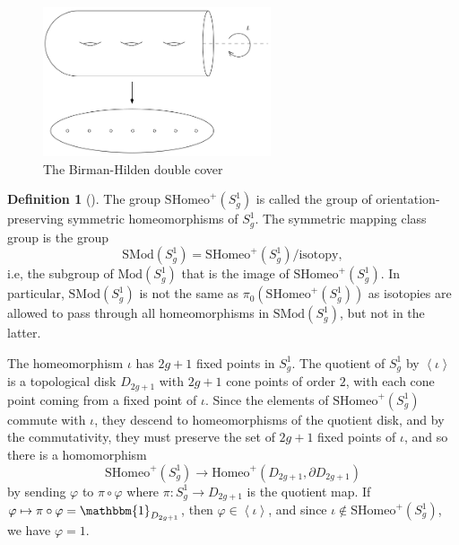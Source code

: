 \documentclass[reqno]{amsart}
\theoremstyle{definition}
\newtheorem{definition}[theorem]{Definition}
\theoremstyle{remark}
\newcommand{\Mod}{{\mathrm{Mod}}}
\newcommand{\SMod}{{\mathrm{SMod}}}
\newcommand{\Homeo}{{\mathrm{Homeo}}}
\newcommand{\SHomeo}{{\mathrm{SHomeo}}}
\begin{document}
 \begin{figure}[H]
     \centering
     \includegraphics[width=0.6\textwidth]{birman-hilden-double-cover.png}
     \caption{The Birman-Hilden double cover}
     \label{fig:birman-hilden-double-cover-png}
 \end{figure}

 \begin{definition}[]
 The group $\SHomeo^{+} \left( S_g^{1} \right) $ is
 called the group of orientation-preserving
 symmetric homeomorphisms of $S_g^{1}$. 
 The symmetric mapping class group is the group
 \[
 \SMod (S_g^{1}) = 
 \SHomeo^{+} \left( S_g^{1} \right) / \text{isotopy},
 \] 
 i.e, the subgroup of $\Mod \left( S_g^{1} \right) $ that
 is the image of $\SHomeo^{+} \left( S_g^{1} \right) $.
 In particular,
 $\SMod \left( S_g^{1} \right) $ is not the same
 as
 $\pi_0 \left( \SHomeo^{+} 
 \left( S_g^{1} \right) \right) $ as isotopies are
 allowed to pass through all homeomorphisms 
 in $\SMod \left( S_g^{1} \right) $, but not
 in the latter.
 \end{definition}

 The homeomorphism $\iota$ has
  $2g+1$ fixed points in
   $S_g^{1}$. The quotient of
   $S_g^{1}$ by $\left<\iota \right>$ is
   a topological disk
   $D_{2g+1}$ with $2g+1$ cone points of order
   $2$, with each cone point coming from a fixed point of $\iota$.
   Since the elements of  $\SHomeo^{+} \left( S_g^{1} \right) $ 
   commute with $\iota$, they descend to homeomorphisms
   of the quotient disk, and by the commutativity, they
   must preserve the set of  $2g+1$ fixed points of $\iota$,
   and so there is a homomorphism
    \[
   \SHomeo^{+} \left( S_g^{1} \right) 
   \to \Homeo^{+} \left( D_{2g+1}, \partial D_{2g+1} \right) 
   \] 
   by sending
   $\varphi $ to
   $\pi \circ \varphi $ where
   $\pi \colon S_g^{1} \to 
   D_{2g+1}$ is the quotient map. If
   $\varphi  \mapsto \pi \circ \varphi  = \mathbbm{1}_{
   D_{2g+1}}$, then $\varphi  
   \in \left<\iota \right>$, and since $\iota 
   \not\in \SHomeo^{+} \left( S_g^{1} \right) $, we have
   $\varphi  = 1$.
   
\end{document}
